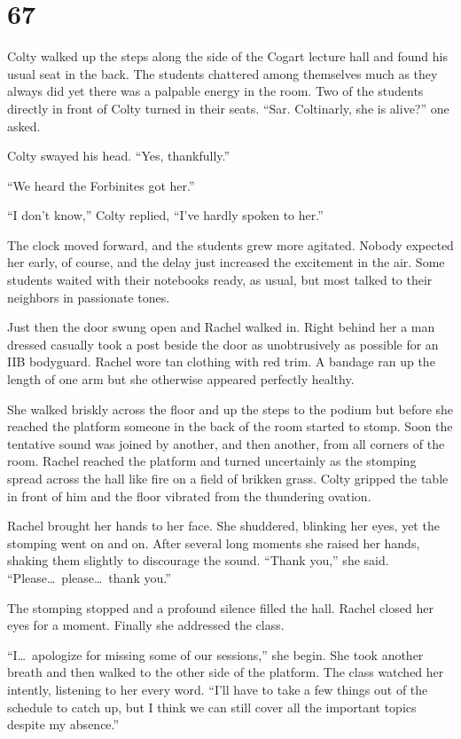
\chapter{67}

Colty walked up the steps along the side of the Cogart lecture hall and found his usual seat in
the back. The students chattered among themselves much as they always did yet there was a
palpable energy in the room. Two of the students directly in front of Colty turned in their
seats. ``Sar. Coltinarly, she is alive?'' one asked.

Colty swayed his head. ``Yes, thankfully.''

``We heard the Forbinites got her.''

``I don't know,'' Colty replied, ``I've hardly spoken to her.''

The clock moved forward, and the students grew more agitated. Nobody expected her early, of
course, and the delay just increased the excitement in the air. Some students waited with their
notebooks ready, as usual, but most talked to their neighbors in passionate tones.

Just then the door swung open and Rachel walked in. Right behind her a man dressed casually took
a post beside the door as unobtrusively as possible for an IIB bodyguard. Rachel wore tan
clothing with red trim. A bandage ran up the length of one arm but she otherwise appeared
perfectly healthy.

She walked briskly across the floor and up the steps to the podium but before she reached the
platform someone in the back of the room started to stomp. Soon the tentative sound was joined
by another, and then another, from all corners of the room. Rachel reached the platform and
turned uncertainly as the stomping spread across the hall like fire on a field of brikken grass.
Colty gripped the table in front of him and the floor vibrated from the thundering ovation.

Rachel brought her hands to her face. She shuddered, blinking her eyes, yet the stomping went on
and on. After several long moments she raised her hands, shaking them slightly to discourage the
sound. ``Thank you,'' she said. ``Please\ldots\ please\ldots\ thank you.''

The stomping stopped and a profound silence filled the hall. Rachel closed her eyes for a
moment. Finally she addressed the class.

``I\ldots\ apologize for missing some of our sessions,'' she begin. She took another breath and
then walked to the other side of the platform. The class watched her intently, listening to her
every word. ``I'll have to take a few things out of the schedule to catch up, but I think we can
still cover all the important topics despite my absence.''

